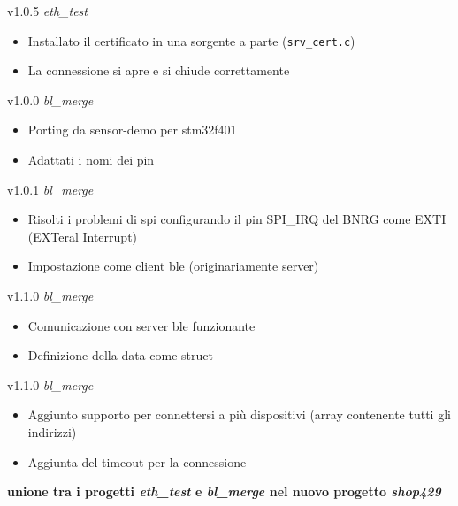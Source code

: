 v1.0.5 \textit{eth\_test}
	\begin{itemize}
	\item Installato il certificato in una sorgente a parte (\texttt{srv\_cert.c})
	\item La connessione si apre e si chiude correttamente
	\end{itemize}
v1.0.0 \textit{bl\_merge}
	\begin{itemize}
	\item Porting da sensor-demo per stm32f401
	\item Adattati i nomi dei pin
	\end{itemize}
v1.0.1 \textit{bl\_merge}
	\begin{itemize}
	\item Risolti i problemi di spi configurando il pin SPI\_IRQ del BNRG come EXTI (EXTeral Interrupt)
	\item Impostazione come client ble (originariamente server)
	\end{itemize}
v1.1.0 \textit{bl\_merge}
	\begin{itemize}
	\item Comunicazione con server ble funzionante
	\item Definizione della data come struct
	\end{itemize}
v1.1.0 \textit{bl\_merge}
	\begin{itemize}
	\item Aggiunto supporto per connettersi a pi\`{u} dispositivi (array contenente tutti gli indirizzi)
	\item Aggiunta del timeout per la connessione
	\end{itemize}

\textbf{unione tra i progetti \textit{eth\_test} e \textit{bl\_merge} nel nuovo progetto \textit{shop429}}


